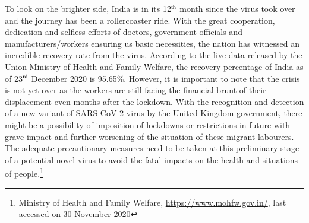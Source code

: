 \begin{multicols}{2}
\noi
To look on the brighter side, India is in its 12$^{\rm th}$ month since the virus took over and the
journey has been a rollercoaster ride. With the great cooperation, dedication and selfless
efforts of doctors, government officials and manufacturers/workers ensuring us basic
necessities, the nation has witnessed an incredible recovery rate from the virus. According to
the live data released by the Union Ministry of Health and Family Welfare, the recovery
percentage of India as of 23$^{\rm rd}$ December 2020 is 95.65\%. However, it is important to note that
the crisis is not yet over as the workers are still facing the financial brunt of their
displacement even months after the lockdown. With the recognition and detection of a new
variant of SARS-CoV-2 virus by the United Kingdom government, there might be a
possibility of imposition of lockdowns or restrictions in future with grave impact and further
worsening of the situation of these migrant labourers. The adequate precautionary measures
need to be taken at this preliminary stage of a potential novel virus to avoid the fatal impacts
on the health and situations of people.\footnote{Ministry of Health and Family Welfare, \url{https://www.mohfw.gov.in/}, last accessed on 30 November 2020}


\end{multicols}
\label{end2021-art8}
